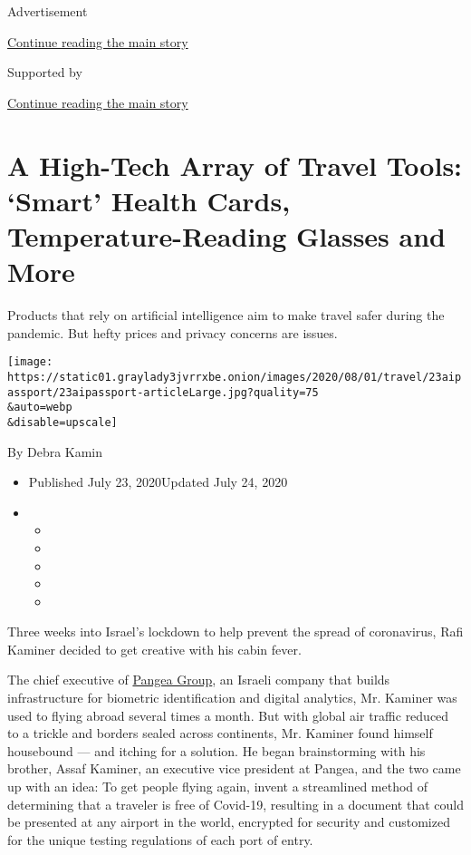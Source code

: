Advertisement

\protect\hyperlink{after-top}{Continue reading the main story}

Supported by

\protect\hyperlink{after-sponsor}{Continue reading the main story}

\hypertarget{a-high-tech-array-of-travel-tools-smart-health-cards-temperature-reading-glasses-and-more}{%
\section{A High-Tech Array of Travel Tools: `Smart' Health Cards,
Temperature-Reading Glasses and
More}\label{a-high-tech-array-of-travel-tools-smart-health-cards-temperature-reading-glasses-and-more}}

Products that rely on artificial intelligence aim to make travel safer
during the pandemic. But hefty prices and privacy concerns are issues.

\texttt{[image: https://static01.graylady3jvrrxbe.onion/images/2020/08/01/travel/23aipassport/23aipassport-articleLarge.jpg?quality=75\\\&auto=webp\\\&disable=upscale]}

By Debra Kamin

\begin{itemize}
\item
  Published July 23, 2020Updated July 24, 2020
\item
  \begin{itemize}
  \item
  \item
  \item
  \item
  \item
  \end{itemize}
\end{itemize}

Three weeks into Israel's lockdown to help prevent the spread of
coronavirus, Rafi Kaminer decided to get creative with his cabin fever.

The chief executive of \href{https://pangea-it.com/}{Pangea Group}, an
Israeli company that builds infrastructure for biometric identification
and digital analytics, Mr. Kaminer was used to flying abroad several
times a month. But with global air traffic reduced to a trickle and
borders sealed across continents, Mr. Kaminer found himself housebound
--- and itching for a solution. He began brainstorming with his brother,
Assaf Kaminer, an executive vice president at Pangea, and the two came
up with an idea: To get people flying again, invent a streamlined method
of determining that a traveler is free of Covid-19, resulting in a
document that could be presented at any airport in the world, encrypted
for security and customized for the unique testing regulations of each
port of entry.

